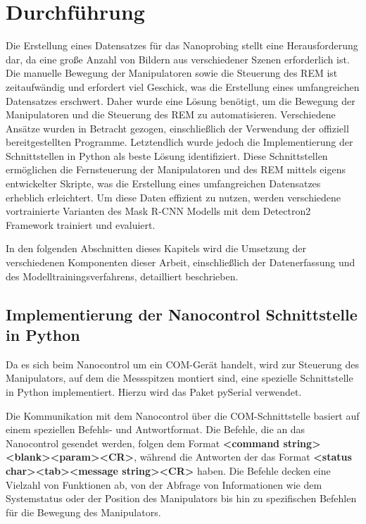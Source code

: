 \clearpage
\chapter{Durchführung}
Die Erstellung eines Datensatzes für das Nanoprobing stellt eine Herausforderung dar, da eine große Anzahl von Bildern aus verschiedener Szenen erforderlich ist. Die manuelle Bewegung der Manipulatoren sowie die Steuerung des REM ist zeitaufwändig und erfordert viel Geschick, was die Erstellung eines umfangreichen Datensatzes erschwert.
Daher wurde eine Lösung benötigt, um die Bewegung der Manipulatoren und die Steuerung des REM zu automatisieren.
Verschiedene Ansätze wurden in Betracht gezogen, einschließlich der Verwendung der offiziell bereitgestellten Programme. Letztendlich wurde jedoch die Implementierung der Schnittstellen in Python als beste Lösung identifiziert.
Diese Schnittstellen ermöglichen die Fernsteuerung der Manipulatoren und des REM mittels eigens entwickelter Skripte, was die Erstellung eines umfangreichen Datensatzes erheblich erleichtert.
Um diese Daten effizient zu nutzen, werden verschiedene vortrainierte Varianten des Mask R-CNN Modells mit dem Detectron2 Framework trainiert und evaluiert.

In den folgenden Abschnitten dieses Kapitels wird die Umsetzung der verschiedenen Komponenten dieser Arbeit, einschließlich der Datenerfassung und des Modelltrainingsverfahrens, detailliert beschrieben.

\section{Implementierung der Nanocontrol Schnittstelle in Python}
Da es sich beim Nanocontrol um ein COM-Gerät handelt, wird zur Steuerung des Manipulators, auf dem die Messspitzen montiert sind, eine spezielle Schnittstelle in Python implementiert. Hierzu wird das Paket pySerial verwendet.

Die Kommunikation mit dem Nanocontrol über die COM-Schnittstelle basiert auf einem speziellen Befehls- und Antwortformat.
Die Befehle, die an das Nanocontrol gesendet werden, folgen dem Format \textbf{<command string><blank><param><CR>}, während die Antworten der das Format \textbf{<status char><tab><message string><CR>} haben.
Die Befehle decken eine Vielzahl von Funktionen ab, von der Abfrage von Informationen wie dem Systemstatus oder der Position des Manipulators bis hin zu spezifischen Befehlen für die Bewegung des Manipulators.

